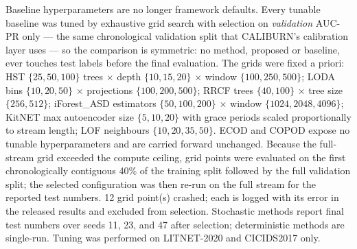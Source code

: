 Baseline hyperparameters are no longer framework defaults. Every tunable
baseline was tuned by exhaustive grid search with selection on
\emph{validation} AUC-PR only --- the same chronological validation split
that CALIBURN's calibration layer uses --- so the comparison is symmetric:
no method, proposed or baseline, ever touches test labels before the final
evaluation. The grids were fixed a priori: HST
$\{25,50,100\}$ trees $\times$ depth $\{10,15,20\}$ $\times$ window
$\{100,250,500\}$; LODA bins $\{10,20,50\}$ $\times$ projections
$\{100,200,500\}$; RRCF trees $\{40,100\}$ $\times$ tree size
$\{256,512\}$; iForest\_ASD estimators $\{50,100,200\}$ $\times$ window
$\{1024,2048,4096\}$; KitNET max autoencoder size $\{5,10,20\}$ with
grace periods scaled proportionally to stream length; LOF neighbours
$\{10,20,35,50\}$. ECOD and COPOD expose no tunable hyperparameters and
are carried forward unchanged. Because the full-stream grid exceeded the compute ceiling, grid points were evaluated on the first chronologically contiguous 40\% of the training split followed by the full validation split; the selected configuration was then re-run on the full stream for the reported test numbers. 12 grid point(s) crashed; each is logged with its error in the released results and excluded from selection.
Stochastic methods report final test numbers over seeds 11, 23, and 47
after selection; deterministic methods are single-run. Tuning was performed
on LITNET-2020 and CICIDS2017 only.
